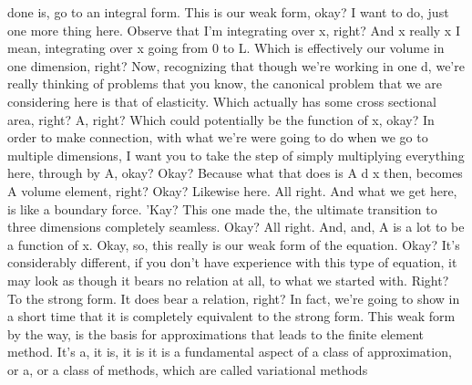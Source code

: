 \documentclass[10pt]{article}
\begin{document}
done is, go to an integral form. This is our weak form, okay? I want to do, just one more thing here. Observe that I'm integrating over x, right? And x really x I mean, integrating over x going from 0 to L. Which is effectively our volume in one dimension, right? Now, recognizing that though we're working in one d, we're really thinking of problems that you know, the canonical problem that we are considering here is that of elasticity. Which actually has some cross sectional area, right? A, right? Which could potentially be the function of x, okay? In order to make connection, with what we're were going to do when we go to multiple dimensions, I want you to take the step of simply multiplying everything here, through by A, okay? Okay? Because what that does is A d x then, becomes A volume element, right? Okay? Likewise here. All right. And what we get here, is like a boundary force. 'Kay? This one made the, the ultimate transition to three dimensions completely seamless. Okay? All right. And, and, A is a lot to be a function of x. Okay, so, this really is our weak form of the equation. Okay? It's considerably different, if you don't have experience with this type of equation, it may look as though it bears no relation at all, to what we started with. Right? To the strong form. It does bear a relation, right? In fact, we're going to show in a short time that it is completely equivalent to the strong form. This weak form by the way, is the basis for approximations that leads to the finite element method. It's a, it is, it is it is a fundamental aspect of a class of approximation, or a, or a class of methods, which are called variational methods
\end{document}
